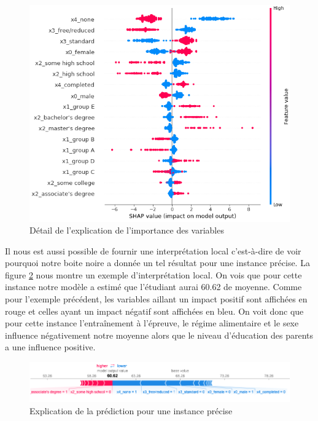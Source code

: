 \newpage
\begin{figure}[h]
    \includegraphics[scale=0.6]{src_img/shapPlotDetail.png}
    \caption{Détail de l'explication de l'importance des variables}
    \label{shapPlotDetail}
\end{figure}
Il nous est aussi possible de fournir une interprétation local c'est-à-dire de voir pourquoi notre boite noire a donnée un tel résultat pour une instance précise. La figure \ref{shapPlotLocal} nous montre un exemple d'interprétation local. On vois que pour cette instance notre modèle a estimé que l'étudiant aurai 60.62 de moyenne. Comme pour l'exemple précédent, les variables aillant un impact positif sont affichées en rouge et celles ayant un impact négatif sont affichées en bleu. On voit donc que pour cette instance l'entraînement à l'épreuve, le régime alimentaire et le sexe influence négativement notre moyenne alors que le niveau d’éducation des parents a une influence positive.
\begin{figure}[h]
    \includegraphics[scale=0.5]{src_img/shapPlotLocal.png}
    \caption{Explication de la prédiction pour une instance précise}
    \label{shapPlotLocal}
\end{figure}

